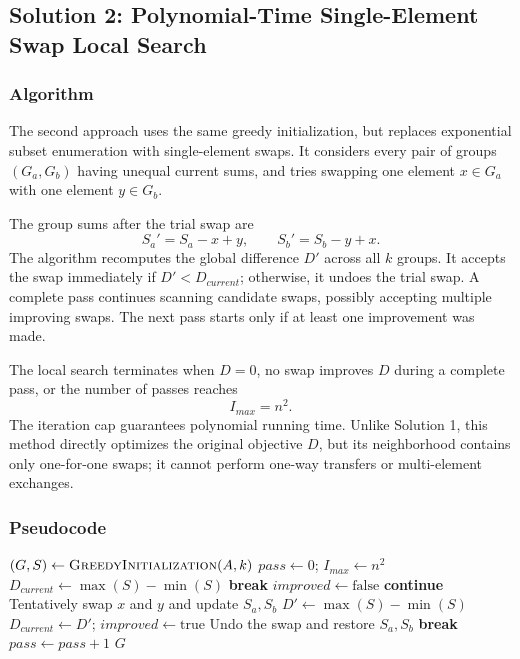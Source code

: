 \documentclass[11pt,a4paper]{article}
\begin{document}
\subsection{Solution 2: Polynomial-Time Single-Element Swap Local Search}
\subsubsection{Algorithm}
The second approach uses the same greedy initialization, but replaces exponential subset enumeration with single-element swaps. It considers every pair of groups $(G_a,G_b)$ having unequal current sums, and tries swapping one element $x\in G_a$ with one element $y\in G_b$.

The group sums after the trial swap are
\begin{equation}S_a'=S_a-x+y,\qquad S_b'=S_b-y+x.\end{equation}
The algorithm recomputes the global difference $D'$ across all $k$ groups. It accepts the swap immediately if $D'<D_{current}$; otherwise, it undoes the trial swap. A complete pass continues scanning candidate swaps, possibly accepting multiple improving swaps. The next pass starts only if at least one improvement was made.

The local search terminates when $D=0$, no swap improves $D$ during a complete pass, or the number of passes reaches
\begin{equation}I_{max}=n^2.\end{equation}
The iteration cap guarantees polynomial running time. Unlike Solution 1, this method directly optimizes the original objective $D$, but its neighborhood contains only one-for-one swaps; it cannot perform one-way transfers or multi-element exchanges.

\subsubsection{Pseudocode}
\begin{algorithm}[ht]
\caption{Polynomial single-element swap search}
\begin{algorithmic}[1]
\State $(G,S)\gets\textsc{GreedyInitialization}(A,k)$
\State $pass\gets0$; $I_{max}\gets n^2$
\State $D_{current}\gets\max(S)-\min(S)$
\State \textbf{break}
\EndIf
\State $improved\gets\text{false}$
\State \textbf{continue}
\EndIf
{}
\State Tentatively swap $x$ and $y$ and update $S_a,S_b$
\State $D'\gets\max(S)-\min(S)$
\State $D_{current}\gets D'$; $improved\gets\text{true}$
\Else
\State Undo the swap and restore $S_a,S_b$
\EndIf
\EndFor
\EndFor
\EndFor
{}
\State \textbf{break}
\EndIf
\State $pass\gets pass+1$
\EndWhile
\State \Return $G$
\end{algorithmic}
\end{algorithm}
\end{document}
